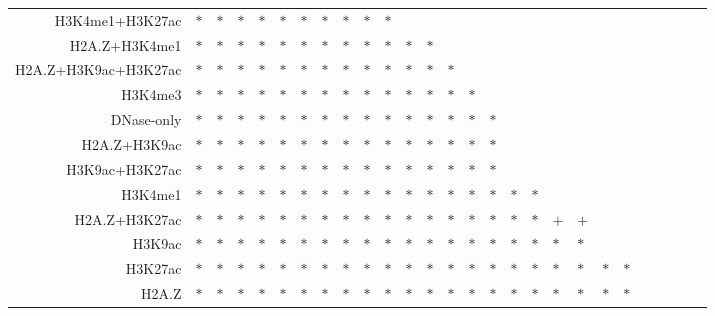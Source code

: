 \begin{table}[h!]
\begin{center}
\begin{tabular}{ rABABABCABCACDCDCAEGCDECEFE }
    H3K4me1+H3K27ac & $*$ & $*$ & $*$ & $*$ & $*$ & $*$ & $*$ & $*$ & $*$ & $*$ &     &     &     &     &     &     &     &     &     &     &     &     &     &     &      &     \\
    H2A.Z+H3K4me1 & $*$ & $*$ & $*$ & $*$ & $*$ & $*$ & $*$ & $*$ & $*$ & $*$ & $*$ & $*$ &     &     &     &     &     &     &     &     &     &     &     &     &      &     \\
    H2A.Z+H3K9ac+H3K27ac & $*$ & $*$ & $*$ & $*$ & $*$ & $*$ & $*$ & $*$ & $*$ & $*$ & $*$ & $*$ & $*$ &     &     &     &     &     &     &     &     &     &     &     &     &      \\
    H3K4me3 & $*$ & $*$ & $*$ & $*$ & $*$ & $*$ & $*$ & $*$ & $*$ & $*$ & $*$ & $*$ & $*$ & $*$ &     &     &     &     &     &     &     &     &     &     &     &      \\

    DNase-only & $*$ & $*$ & $*$ & $*$ & $*$ & $*$ & $*$ & $*$ & $*$ & $*$ & $*$ & $*$ & $*$ & $*$ & $*$ &     &     &     &     &      &     &     &     &     &    &      \\

    H2A.Z+H3K9ac & $*$ & $*$ & $*$ & $*$ & $*$ & $*$ & $*$ & $*$ & $*$ & $*$ & $*$ & $*$ & $*$ & $*$ & $*$ &     &     &     &     &      &     &     &     &     &     &     \\
    H3K9ac+H3K27ac & $*$ & $*$ & $*$ & $*$ & $*$ & $*$ & $*$ & $*$ & $*$ & $*$ & $*$ & $*$ & $*$ & $*$ & $*$ &     &     &     &    &      &     &     &     &     &      &    \\
    H3K4me1 & $*$ & $*$ & $*$ & $*$ & $*$ & $*$ & $*$ & $*$ & $*$ & $*$ & $*$ & $*$ & $*$ & $*$ & $*$ & $*$ & $*$ &     &     &     &     &     &     &     &     &     \\
    H2A.Z+H3K27ac & $*$ & $*$ & $*$ & $*$ & $*$ & $*$ & $*$ & $*$ & $*$ & $*$ & $*$ & $*$ & $*$ & $*$ & $*$ & $*$ & $*$ & $+$ &  $+$  &      &     &     &     &     &     &     \\
    H3K9ac & $*$ & $*$ & $*$ & $*$ & $*$ & $*$ & $*$ & $*$ & $*$ & $*$ & $*$ & $*$ & $*$ & $*$ & $*$ & $*$ & $*$ & $*$ &  $*$  &      &     &     &     &     &     &     \\
    H3K27ac & $*$ & $*$ & $*$ & $*$ & $*$ & $*$ & $*$ & $*$ & $*$ & $*$ & $*$ & $*$ & $*$ & $*$ & $*$ & $*$ & $*$ & $*$ & $*$ & $*$ &  $*$ &   &     &     &    &     \\
    H2A.Z & $*$ & $*$ & $*$ & $*$ & $*$ & $*$ & $*$ & $*$ & $*$ & $*$ & $*$ & $*$ & $*$ & $*$ & $*$ & $*$ & $*$ & $*$ & $*$ & $*$ &  $*$ &   &     &     &     &    \\
    \hline
  \end{tabular}
\end{center}
\vspace{0.0cm}
\end{table}

